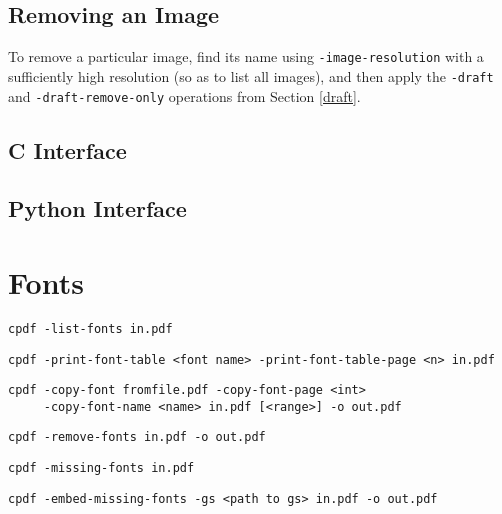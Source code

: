 \documentclass{book}
\begin{document}
\section{Removing an Image}

To remove a particular image, find its name using \texttt{-image-resolution} with a sufficiently high resolution (so as to list all images), and then apply the \texttt{-draft} and \texttt{-draft-remove-only} operations from Section \ref{draft}. 

\begin{cpdflib}
\clearpage
\section*{C Interface}
\begin{small}\tt

\end{small}
\end{cpdflib}

\begin{pycpdflib}
\clearpage
\section*{Python Interface}
\begin{small}\tt

\end{small}
\end{pycpdflib}
\pagestyle{fancy}

\chapter{Fonts}\pagestyle{fancy}\label{chap:14}
 {\small \begin{framed}

  \small\noindent\verb!cpdf -list-fonts in.pdf!

  \vspace{1.5mm}
  \noindent\verb!cpdf -print-font-table <font name> -print-font-table-page <n> in.pdf!
  
  \vspace{1.5mm}
  \noindent\verb!cpdf -copy-font fromfile.pdf -copy-font-page <int>!\\
  \noindent\verb!     -copy-font-name <name> in.pdf [<range>] -o out.pdf!

  \vspace{1.5mm}
  \noindent\verb!cpdf -remove-fonts in.pdf -o out.pdf!

  \vspace{1.5mm}
  \noindent\verb!cpdf -missing-fonts in.pdf!

  \vspace{1.5mm}
  \noindent\verb!cpdf -embed-missing-fonts -gs <path to gs> in.pdf -o out.pdf!
  \end{framed}}
\end{document}
